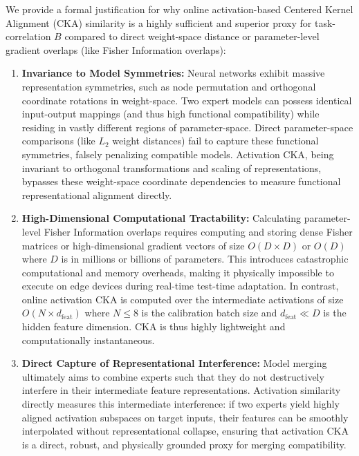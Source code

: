 \begin{remark}
\label{rem:cka_justification}
We provide a formal justification for why online activation-based Centered Kernel Alignment (CKA) similarity \cite{kornblith2019similarity} is a highly sufficient and superior proxy for task-correlation $B$ compared to direct weight-space distance or parameter-level gradient overlaps (like Fisher Information overlaps):
\begin{enumerate}
    \item \textbf{Invariance to Model Symmetries:} Neural networks exhibit massive representation symmetries, such as node permutation and orthogonal coordinate rotations in weight-space. Two expert models can possess identical input-output mappings (and thus high functional compatibility) while residing in vastly different regions of parameter-space. Direct parameter-space comparisons (like $L_2$ weight distances) fail to capture these functional symmetries, falsely penalizing compatible models. Activation CKA, being invariant to orthogonal transformations and scaling of representations, bypasses these weight-space coordinate dependencies to measure functional representational alignment directly.
    \item \textbf{High-Dimensional Computational Tractability:} Calculating parameter-level Fisher Information overlaps requires computing and storing dense Fisher matrices or high-dimensional gradient vectors of size $O(D \times D)$ or $O(D)$ where $D$ is in millions or billions of parameters. This introduces catastrophic computational and memory overheads, making it physically impossible to execute on edge devices during real-time test-time adaptation. In contrast, online activation CKA is computed over the intermediate activations of size $O(N \times d_{\text{feat}})$ where $N \le 8$ is the calibration batch size and $d_{\text{feat}} \ll D$ is the hidden feature dimension. CKA is thus highly lightweight and computationally instantaneous.
    \item \textbf{Direct Capture of Representational Interference:} Model merging ultimately aims to combine experts such that they do not destructively interfere in their intermediate feature representations. Activation similarity directly measures this intermediate interference: if two experts yield highly aligned activation subspaces on target inputs, their features can be smoothly interpolated without representational collapse, ensuring that activation CKA is a direct, robust, and physically grounded proxy for merging compatibility.
\end{enumerate}
\end{remark}

